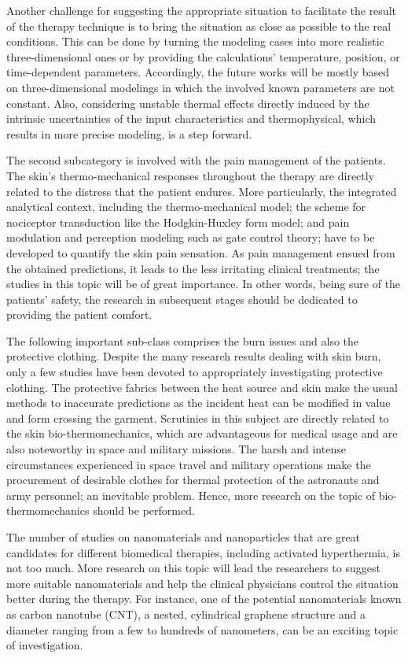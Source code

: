 \documentclass[sn-mathphys]{sn-jnl}%
\theoremstyle{thmstyleone}%
\theoremstyle{thmstyletwo}%
\theoremstyle{thmstylethree}%
\begin{document}
Another challenge for suggesting the appropriate situation to facilitate the result of the therapy technique is to bring the situation as close as possible to the real conditions. This can be done by turning the modeling cases into more realistic three-dimensional ones or by providing the calculations' temperature, position, or time-dependent parameters. 
Accordingly, the future works will be mostly based on three-dimensional modelings in which the involved known parameters are not constant. Also, considering unstable thermal effects directly induced by the intrinsic uncertainties of the input characteristics and thermophysical, which results in more precise modeling, is a step forward.

The second subcategory is involved with the pain management of the patients. The skin's thermo-mechanical responses throughout the therapy are directly related to the distress that the patient endures.
More particularly, the integrated analytical context, including the thermo-mechanical model; the scheme for nociceptor transduction like the Hodgkin-Huxley form model; and pain modulation and perception modeling such as gate control theory; have to be developed to quantify the skin pain sensation. As pain management ensued from the obtained predictions, it leads to the less irritating clinical treatments; the studies in this topic will be of great importance. In other words, being sure of the patients' safety, the research in subsequent stages should be dedicated to providing the patient comfort.

The following important sub-class comprises the burn issues and also the protective clothing. Despite the many research results dealing with skin burn, only a few studies have been devoted to appropriately investigating protective clothing. The protective fabrics between the heat source and skin make the usual methods to inaccurate predictions as the incident heat can be modified in value and form crossing the garment. Scrutinies in this subject are directly related to the skin bio-thermomechanics, which are advantageous for medical usage and are also noteworthy in space and military missions. The harsh and intense circumstances experienced in space travel and military operations make the procurement of desirable clothes for thermal protection of the astronauts and army personnel; an inevitable problem. Hence, more research on the topic of bio-thermomechanics should be performed.

The number of studies on nanomaterials and nanoparticles that are great candidates for different biomedical therapies, including activated hyperthermia, is not too much. More research on this topic will lead the researchers to suggest more suitable nanomaterials and help the clinical physicians control the situation better during the therapy. For instance, one of the potential nanomaterials known as carbon nanotube (CNT), a nested, cylindrical graphene structure and a diameter ranging from a few to hundreds of nanometers, can be an exciting topic of investigation.
\end{document}
